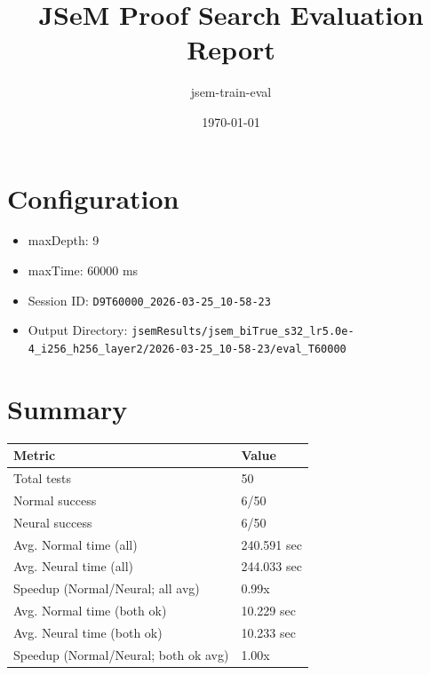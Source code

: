 \documentclass[a4paper,10pt]{article}
\title{JSeM Proof Search Evaluation Report}
\author{jsem-train-eval}
\date{\today}
\begin{document}
\maketitle

\section{Configuration}
\begin{itemize}
\item maxDepth: 9
\item maxTime: 60000 ms
\item Session ID: \texttt{D9T60000\_2026-03-25\_10-58-23}
\item Output Directory: \texttt{jsemResults/jsem\_biTrue\_s32\_lr5.0e-4\_i256\_h256\_layer2/2026-03-25\_10-58-23/eval\_T60000}
\end{itemize}

\section{Summary}
\begin{tabular}{ll}
\toprule
\textbf{Metric} & \textbf{Value} \\
\midrule
Total tests & 50 \\
Normal success & 6/50 \\
Neural success & 6/50 \\
\midrule
Avg. Normal time (all) & 240.591 sec \\
Avg. Neural time (all) & 244.033 sec \\
Speedup (Normal/Neural; all avg) & 0.99x \\
Avg. Normal time (both ok) & 10.229 sec \\
Avg. Neural time (both ok) & 10.233 sec \\
Speedup (Normal/Neural; both ok avg) & 1.00x \\
\bottomrule
\end{tabular}
\end{document}
